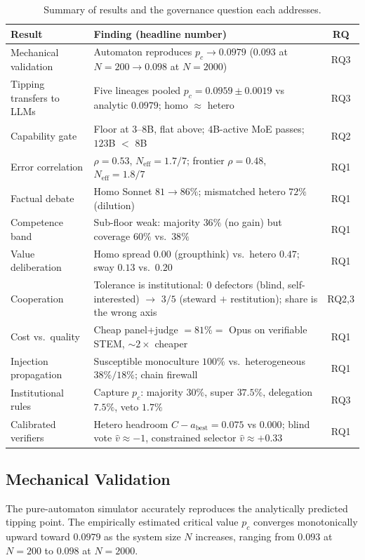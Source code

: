 \documentclass[manuscript,screen,review]{acmart}
\newcommand{\rev}[1]{\textcolor{revblue}{#1}}
\begin{document}
\begin{table}[t]
\caption{Summary of results and the governance question each addresses.}
\label{tab:summary}
\small
\begin{tabular}{@{}p{3.4cm}p{6.2cm}c@{}}
\toprule
\textbf{Result} & \textbf{Finding (headline number)} & \textbf{RQ} \\
\midrule
Mechanical validation & Automaton reproduces $p_c\!\to\!0.0979$ ($0.093$ at $N{=}200 \to 0.098$ at $N{=}2000$) & RQ3 \\
\rev{Tipping transfers to LLMs} & \rev{Five lineages pooled $p_c{=}0.0959\pm0.0019$ vs analytic $0.0979$; homo $\approx$ hetero} & \rev{RQ3} \\
\rev{Capability gate} & \rev{Floor at $3$--$8$B, flat above; $4$B-active MoE passes; $123$B $<$ $8$B} & \rev{RQ2} \\
Error correlation & $\rho{=}0.53$, $N_{\mathrm{eff}}{=}1.7/7$; frontier $\rho{=}0.48$, $N_{\mathrm{eff}}{=}1.8/7$ & RQ1 \\
Factual debate & Homo Sonnet $81\!\to\!86\%$; mismatched hetero $72\%$ (dilution) & RQ1 \\
Competence band & Sub-floor weak: majority $36\%$ (no gain) but coverage $60\%$ vs.\ $38\%$ & RQ1 \\
Value deliberation & Homo spread $0.00$ (groupthink) vs.\ hetero $0.47$; sway $0.13$ vs.\ $0.20$ & RQ1 \\
\rev{Cooperation} & \rev{Tolerance is institutional: $0$ defectors (blind, self-interested) $\to$ $3/5$ (steward $+$ restitution); share is the wrong axis} & \rev{RQ2,3} \\
Cost vs.\ quality & Cheap panel+judge $=81\%=$ Opus on verifiable STEM, $\sim2\times$ cheaper & RQ1 \\
Injection propagation & Susceptible monoculture $100\%$ vs.\ heterogeneous $38\%/18\%$; chain firewall & RQ1 \\
Institutional rules & Capture $p_c$: majority $30\%$, super $37.5\%$, delegation $7.5\%$, veto $1.7\%$ & RQ3 \\
\rev{Calibrated verifiers} & \rev{Hetero headroom $C{-}a_{\mathrm{best}}{=}0.075$ vs $0.000$; blind vote $\hat v{\approx}{-}1$, constrained selector $\hat v{\approx}{+}0.33$} & \rev{RQ1} \\
\bottomrule
\end{tabular}
\end{table}

\subsection{Mechanical Validation}
The pure-automaton simulator accurately reproduces the analytically predicted tipping point. The empirically estimated critical value $p_c$ converges monotonically upward toward $0.0979$ as the system size $N$ increases, ranging from $0.093$ at $N{=}200$ to $0.098$ at $N{=}2000$.
\end{document}
